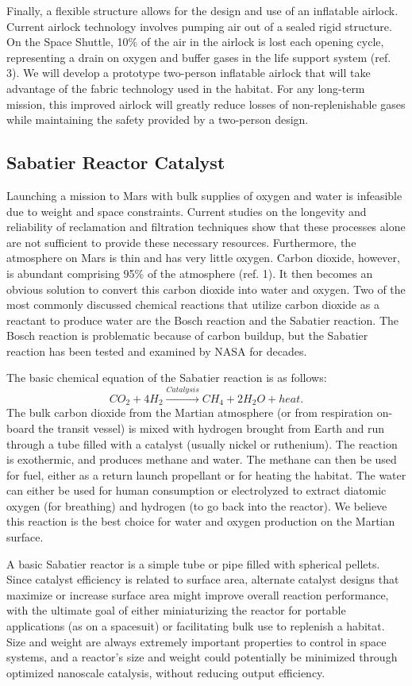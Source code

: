 \documentclass[12pt,letterpaper,oneside,twocolumn]{article}
\begin{document}
Finally, a flexible structure allows for the design and use of an inflatable airlock.  Current airlock technology involves pumping air out of a sealed rigid structure.  On the Space Shuttle, 10\% of the air in the airlock is lost each opening cycle, representing a drain on oxygen and buffer gases in the life support system (ref. 3). We will develop a prototype two-person inflatable airlock that will take advantage of the fabric technology used in the habitat. For any long-term mission, this improved airlock will greatly reduce losses of non-replenishable gases while maintaining the safety provided by a two-person design.

\subsection{Sabatier Reactor Catalyst}
Launching a mission to Mars with bulk supplies of oxygen and water is infeasible due to weight and space constraints. Current studies on the longevity and reliability of reclamation and filtration techniques show that these processes alone are not sufficient to provide these necessary resources.  Furthermore, the atmosphere on Mars is thin and has very little oxygen. Carbon dioxide, however, is abundant comprising 95\% of the atmosphere (ref. 1). It then becomes an obvious solution to convert this carbon dioxide into water and oxygen. Two of the most commonly discussed chemical reactions that utilize carbon dioxide as a reactant to produce water are the Bosch reaction and the Sabatier reaction. The Bosch reaction is problematic because of carbon buildup, but the Sabatier reaction has been tested and examined by NASA for decades.

The basic chemical equation of the Sabatier reaction is as follows:
\[ CO_2 + 4H_2 \xrightarrow{Catalysis} CH_4 + 2H_2O + heat.\] %
The bulk carbon dioxide from the Martian atmosphere (or from respiration on-board the transit vessel) is mixed with hydrogen brought from Earth and run through a tube filled with a catalyst (usually nickel or ruthenium). The reaction is exothermic, and produces methane and water. The methane can then be used for fuel, either as a return launch propellant or for heating the habitat. The water can either be used for human consumption or electrolyzed to extract diatomic oxygen (for breathing) and hydrogen (to go back into the reactor). We believe this reaction is the best choice for water and oxygen production on the Martian surface.

A basic Sabatier reactor is a simple tube or pipe filled with spherical pellets. Since catalyst efficiency is related to surface area, alternate catalyst designs that maximize or increase surface area might improve overall reaction performance, with the ultimate goal of either miniaturizing the reactor for portable applications (as on a spacesuit) or facilitating bulk use to replenish a habitat. Size and weight are always extremely important properties to control in space systems, and a reactor’s size and weight could potentially be minimized through optimized nanoscale catalysis, without reducing output efficiency. 
\end{document}
